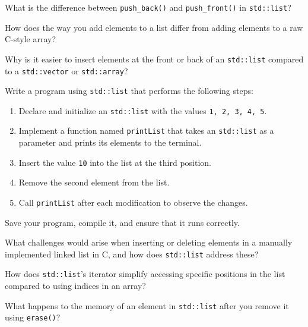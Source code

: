 \begin{challenge}
\begin{task}
        \begin{questions}
            \item What is the difference between \texttt{push_back()} and \texttt{push_front()} in \texttt{std::list}?
            \item How does the way you add elements to a list differ from adding elements to a raw C-style array?
            \item Why is it easier to insert elements at the front or back of an \texttt{std::list} compared to a \texttt{std::vector} or \texttt{std::array}?
        \end{questions}
    \end{task}

    \begin{task}
        Write a program using \texttt{std::list} that performs the following steps:
        \begin{enumerate}
            \item Declare and initialize an \texttt{std::list} with the values \texttt{1, 2, 3, 4, 5}.
            \item Implement a function named \texttt{printList} that takes an \texttt{std::list} as a parameter and prints its elements to the terminal.
            \item Insert the value \texttt{10} into the list at the third position.
            \item Remove the second element from the list.
            \item Call \texttt{printList} after each modification to observe the changes.
        \end{enumerate}

        Save your program, compile it, and ensure that it runs correctly.

        \begin{questions}
            \item What challenges would arise when inserting or deleting elements in a manually implemented linked list in C, and how does \texttt{std::list} address these?
            \item How does \texttt{std::list}'s iterator simplify accessing specific positions in the list compared to using indices in an array?
            \item What happens to the memory of an element in \texttt{std::list} after you remove it using \texttt{erase()}?
        \end{questions}
    \end{task}


\end{challenge}
